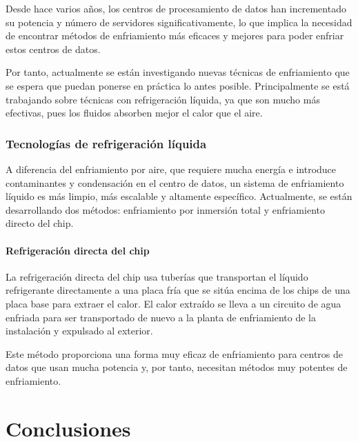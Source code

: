 Desde hace varios años, los centros de procesamiento de datos han incrementado su potencia y número de servidores significativamente, lo que implica la necesidad de encontrar métodos de enfriamiento más eficaces y mejores para poder enfriar estos centros de datos.

Por tanto, actualmente se están investigando nuevas técnicas de enfriamiento que se espera que puedan ponerse en práctica lo antes posible. Principalmente se está trabajando sobre técnicas con refrigeración líquida, ya que son mucho más efectivas, pues los fluidos absorben mejor el calor que el aire.

\subsection{Tecnologías de refrigeración líquida}

A diferencia del enfriamiento por aire, que requiere mucha energía e introduce contaminantes y condensación en el centro de datos, un sistema de enfriamiento líquido es más limpio, más escalable y altamente específico. Actualmente, se están desarrollando dos métodos: enfriamiento por inmersión total y enfriamiento directo del chip.

\subsubsection{Refrigeración directa del chip}

La refrigeración directa del chip usa tuberías que transportan el líquido refrigerante directamente a una placa fría que se sitúa encima de los chips de una placa base para extraer el calor. El calor extraído se lleva a un circuito de agua enfriada para ser transportado de nuevo a la planta de enfriamiento de la instalación  y expulsado al exterior.

Este método proporciona una forma muy eficaz de enfriamiento para centros de datos que usan mucha potencia y, por tanto, necesitan métodos muy potentes de enfriamiento.

\chapter{Conclusiones}

